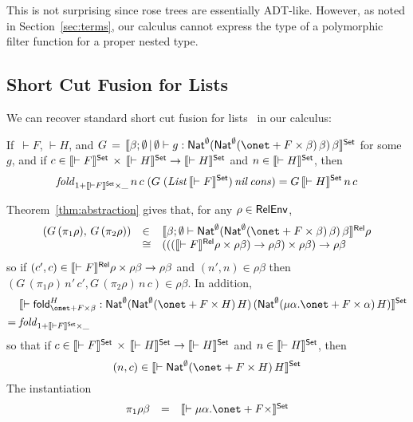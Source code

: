 \documentclass{lmcs}
\theoremstyle{plain}\newtheorem{satz}[thm]{Satz}
\newcommand{\fold}{\mathsf{fold}}
\begin{document}
{\noindent
This is not surprising since rose trees are essentially
ADT-like. However, as noted in Section~\ref{sec:terms}, our calculus
cannot express the type of a polymorphic filter function for a proper
nested type.

\subsection{Short Cut Fusion for Lists}\label{sec:short-cut}

We can recover standard short cut fusion for lists~\cite{glp93} in our
calculus: 
\begin{thm}
If \,$\vdash F$, $\vdash H$, and 
$G \, = \, \setsem{\beta; \emptyset \,|\, \emptyset \vdash g :
  \Nat^{\emptyset} (\Nat^{\emptyset} (\onet + F \times \beta)\,
  \beta)\, \beta}$ for some $g$, and if $c \in \llbracket{\vdash F}\rrbracket^{\mathsf{Set}}
\,\times\, \llbracket{\vdash H}\rrbracket^{\mathsf{Set}} \to \llbracket{\vdash H}\rrbracket^{\mathsf{Set}}$ and $n \in
\llbracket{\vdash H}\rrbracket^{\mathsf{Set}}$, then
\[\mathit{fold}_{1 + \llbracket{\vdash F}\rrbracket^{\mathsf{Set}} \times \_}\, n\, c\; (G\; (\mathit{List}\,
\llbracket{\vdash F}\rrbracket^{\mathsf{Set}})\,\mathit{nil} \,\mathit{cons}) = G \,\llbracket{\vdash
  H}\rrbracket^{\mathsf{Set}}\, n\, c \]
\end{thm}
\proof
Theorem~\ref{thm:abstraction} gives
that, for any $\rho \in \mathsf{RelEnv}$,
\[\begin{array}{lll}
(G \,(\pi_1 \rho), \,G\, (\pi_2 \rho)) & \in 
& \relsem{\beta; \emptyset \vdash \Nat^{\emptyset} (\Nat^{\emptyset}
  (\onet + F \times \beta)\, \beta)\, \beta} \rho \\
& \cong & (((\relsem{\vdash F} \rho \times
\rho\beta) \to \rho\beta) \times \rho\beta) \to \rho\beta
\end{array}\]
so if $(c', c) \in \llbracket{\vdash F}\rrbracket^{\mathsf{Rel}} \rho \times
\rho\beta \to \rho\beta$ and $(n', n) \in \rho\beta$ then
$(G \,(\pi_1 \rho)\, n'\, c', G\, (\pi_2 \rho)\, n\, c)
\in \rho \beta$.
In addition,
\begin{align*}
  &\setsem{\vdash \fold_{\onet + F
    \times \beta}^{H} : \Nat^{\emptyset} (\Nat^{\emptyset} (\onet
  + F \times H)\, H)\, (\Nat^{\emptyset} (\mu \alpha. \onet
  + F \times \alpha)\, H)} \\ =\;
& \mathit{fold}_{1 + \setsem{\vdash F} \times \_}
\end{align*}
so that if $c \in
\llbracket{\vdash F}\rrbracket^{\mathsf{Set}} \,\times\, \llbracket{\vdash H}\rrbracket^{\mathsf{Set}} \to
\llbracket{\vdash H}\rrbracket^{\mathsf{Set}}$ and $n \in \llbracket{\vdash H}\rrbracket^{\mathsf{Set}}$,
 then
\[(n, c) \in \setsem{\vdash \Nat^{\emptyset} (\onet + F \times H)\,
  H}\] The instantiation
\[\begin{array}{lll}
\pi_1 \rho \beta & = & \setsem{\vdash \mu \alpha. \onet + F \times
}
\end{array}\]}
\end{document}
